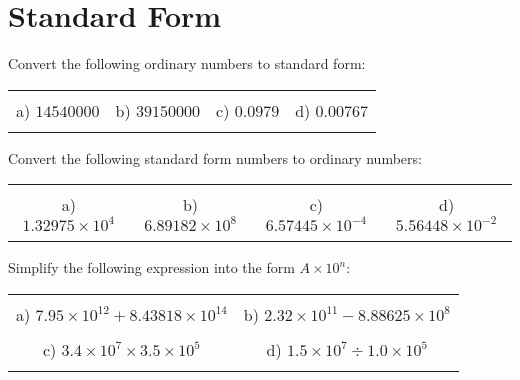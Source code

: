 \documentclass[12pt]{article}
\begin{document}
\section{Standard Form}
Convert the following ordinary numbers to standard form:
\begin{table}[h!]
\centering
\begin{tabular}{c c c c}
\hspace{2cm} & \hspace{5cm} & \hspace{5cm} & \hspace{4cm}\\
a) $14540000$ & b) $39150000$ & c) $0.0979$ & d) $0.00767$\\ \\
\end{tabular}
\end{table}
\newline
Convert the following standard form numbers to ordinary numbers:
\begin{table}[h!]
\centering
\begin{tabular}{c c c c}
\hspace{2cm} & \hspace{5cm} & \hspace{5cm} & \hspace{4cm}\\
a) $1.32975\times10^4$ & b) $6.89182\times10^8$ & c) $6.57445\times10^{-4}$ & d) $5.56448\times10^{-2}$\\ \\
\end{tabular}
\end{table}
\newline
Simplify the following expression into the form $A\times10^n$:
\begin{table}[h!]
\centering
\begin{tabular}{c c}
\hspace{5cm} & \hspace{5cm}\\
a) $7.95\times10^{12} + 8.43818\times10^{14}$ & b) $2.32\times10^{11} - 8.88625\times10^{8}$\\ \\
c) $3.4\times10^{7}\times3.5\times10^{5}$ & d) $1.5\times10^{7}\div1.0\times10^{5}$\\ \\
\end{tabular}
\end{table}
\newline
\newpage
\end{document}
